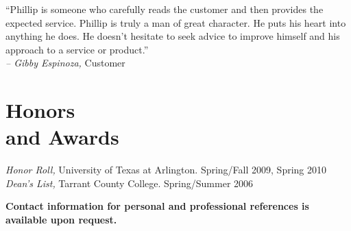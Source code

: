 \documentclass[margin]{res}
\begin{document}
\begin{resume}
                ``Phillip is someone who carefully reads the customer and then 
                provides the expected service. Phillip is truly a man of great character. 
                He puts his heart into anything he does. He doesn't hesitate to seek advice 
                to improve himself and his approach to a service or product.''                    \\
                \textit{-- Gibby Espinoza,} Customer

\vspace{10pt}
                

\section{\textsf{Honors \\and Awards}}
                
                \textit{Honor Roll,} University of Texas at Arlington. Spring/Fall 2009, Spring 2010 \\
                \textit{Dean's List,} Tarrant County College. Spring/Summer 2006

\vspace{12pt}


\textsf{\textbf{\footnotesize Contact information for personal and professional references is available upon request.}}

                
\end{resume}
\end{document}
